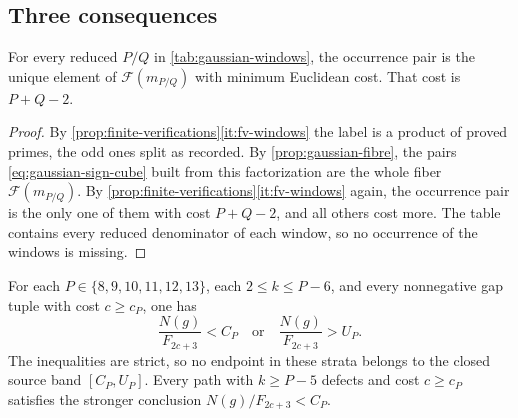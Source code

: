\subsection{Three consequences}

\begin{proposition}\label{prop:finite-windows}
For every reduced $P/Q$ in \cref{tab:gaussian-windows}, the occurrence
pair is the unique element of $\mathcal F(m_{P/Q})$ with minimum
Euclidean cost. That cost is $P+Q-2$.
\end{proposition}

\begin{proof}
By \cref{prop:finite-verifications}\ref{it:fv-windows} the label is a product of proved
primes, the odd ones split as recorded. By \cref{prop:gaussian-fibre}, the
pairs \eqref{eq:gaussian-sign-cube} built from this factorization are the
whole fiber $\mathcal F(m_{P/Q})$. By \cref{prop:finite-verifications}\ref{it:fv-windows}
again, the occurrence pair is the only one of them with cost $P+Q-2$, and
all others cost more. The table contains every reduced denominator of each
window, so no occurrence of the windows is missing.
\end{proof}

\begin{theorem}
\label{thm:tail-covers}
For each $P\in\{8,9,10,11,12,13\}$, each $2\leqslant k\leqslant P-6$, and
every nonnegative gap tuple with cost $c\geqslant c_P$, one has
$$
 \frac{N(g)}{F_{2c+3}}<C_P
 \quad\text{or}\quad
 \frac{N(g)}{F_{2c+3}}>U_P.
$$
The inequalities are strict, so no endpoint in these strata belongs to
the closed source band $[C_P,U_P]$. Every path with $k\geqslant P-5$
defects and cost $c\geqslant c_P$ satisfies the stronger conclusion
$N(g)/F_{2c+3}<C_P$.
\end{theorem}

